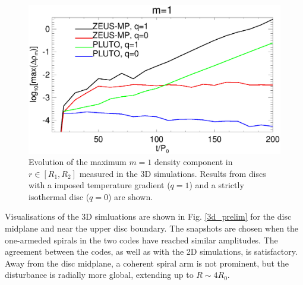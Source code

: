 
\begin{figure}
  \includegraphics[width=\linewidth]{figures/m1_analysis_plot_ampmax3d.ps}
  \caption{Evolution of the maximum $m=1$ density component in  $r\in[R_1,R_2]$
    measured in the 3D simulations. Results from discs with a imposed 
    temperature gradient ($q=1$) and a strictly isothermal disc
    ($q=0$) are shown.  
    \label{3d_ampmax}}   
\end{figure}

Visualisations of the 3D simluations are shown in   
Fig. \ref{3d_prelim} for the disc midplane and near the upper disc
boundary. The snapshots are chosen when the one-armeded spirals in the two codes
have reached similar amplitudes. The agreement between the codes,
as well as with the 2D simulations, is satisfactory. Away from the
disc midplane, a coherent spiral arm is not prominent, but the
disturbance is radially more global, extending up to $R\sim 4R_0$.   

